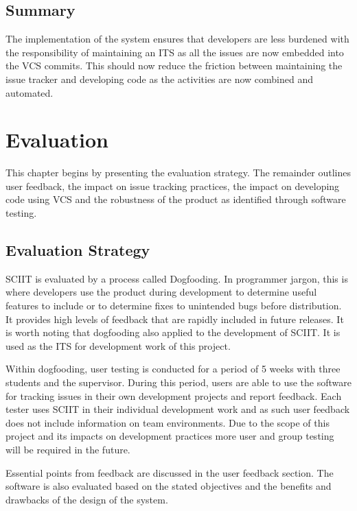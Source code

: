 \documentclass{mproj}
\begin{document}
\section{Summary}

The implementation of the system ensures that developers are less burdened with the responsibility of maintaining an ITS as all the issues are now embedded into the VCS commits. This should now reduce the friction between maintaining the issue tracker and developing code as the activities are now combined and automated.


\chapter{Evaluation}\label{evaluation}

This chapter begins by presenting the evaluation strategy. The remainder outlines user feedback, the impact on issue tracking practices, the impact on developing code using VCS and the robustness of the product as identified through software testing. 

\section{Evaluation Strategy}

SCIIT is evaluated by a process called Dogfooding. In programmer jargon, this is where developers use the product during development to determine useful features to include or to determine fixes to unintended bugs before distribution. It provides high levels of feedback that are rapidly included in future releases. It is worth noting that dogfooding also applied to the development of SCIIT. It is used as the ITS for development work of this project.

Within dogfooding, user testing is conducted for a period of 5 weeks with three students and the supervisor. During this period, users are able to use the software for tracking issues in their own development projects and report feedback. Each tester uses SCIIT in their individual development work and as such user feedback does not include information on team environments. Due to the scope of this project and its impacts on development practices more user and group testing will be required in the future. 

Essential points from feedback are discussed in the user feedback section. The software is also evaluated based on the stated objectives and the benefits and drawbacks of the design of the system.
\end{document}
